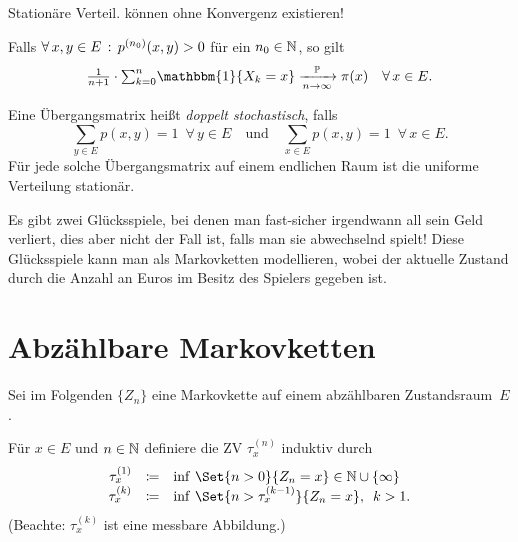 \documentclass{cheat-sheet}
\renewcommand{\P}{\mathbb{P}} %
\newcommand{\ind}{\mathbbm{1}} %
\newcommand{\Defn}[1]{\textcolor{DefinitionColor}{#1}}
\begin{document}
\begin{acht}
  Stationäre Verteil. können ohne Konvergenz existieren!
\end{acht}

\begin{satz}
  Falls $\forall \, {x, y \in E} \,:\, p^{(n_0)}(x, y) > 0$ für ein $n_0 \in \mathbb{N}$, so gilt
  \[
    \tfrac{1}{n+1} \cdot {\sum}_{k=0}^n \ind \{ X_k = x \} \xrightarrow[n \to \infty]{\P} \pi(x)
    \quad \forall \, x \in E.
  \]
\end{satz}

\begin{bem}
  Eine Übergangsmatrix heißt \emph{doppelt stochastisch}, falls
  \[
    {\sum}_{y \in E} p(x, y) = 1 \enspace \forall \, y \in E
    \quad \text{und} \quad
    {\sum}_{x \in E} p(x, y) = 1 \enspace \forall \, x \in E.
  \]
  Für jede solche Übergangsmatrix auf einem endlichen Raum ist die uniforme Verteilung stationär.
\end{bem}


\begin{bem}
  Es gibt zwei Glücksspiele, bei denen man fast-sicher irgendwann all sein Geld verliert, dies aber nicht der Fall ist, falls man sie abwechselnd spielt!
  Diese Glücksspiele kann man als Markovketten modellieren, wobei der aktuelle Zustand durch die Anzahl an Euros im Besitz des Spielers gegeben ist.
\end{bem}


\section{Abzählbare Markovketten}


\begin{nota}
  Sei im Folgenden $\{ Z_n \}$ eine Markovkette auf einem abzählbaren Zustandsraum~$E$.
\end{nota}

\begin{defn}
  Für $x \in E$ und $n \in \mathbb{N}$ definiere die ZV \Defn{$\tau_x^{(n)}$} induktiv durch
  \[ \begin{array}{r c l}
    \tau_x^{(1)} &\coloneqq& \inf\,\Set{n > 0}{Z_n = x} \in \N \cup \{ \infty \} \\
    \tau_x^{(k)} &\coloneqq& \inf\,\Set{n > \tau_x^{(k-1)}}{Z_n = x}, \enspace k > 1.
  \end{array} \]
  (Beachte: $\tau_x^{(k)}$ ist eine messbare Abbildung.)
\end{defn}
\end{document}
